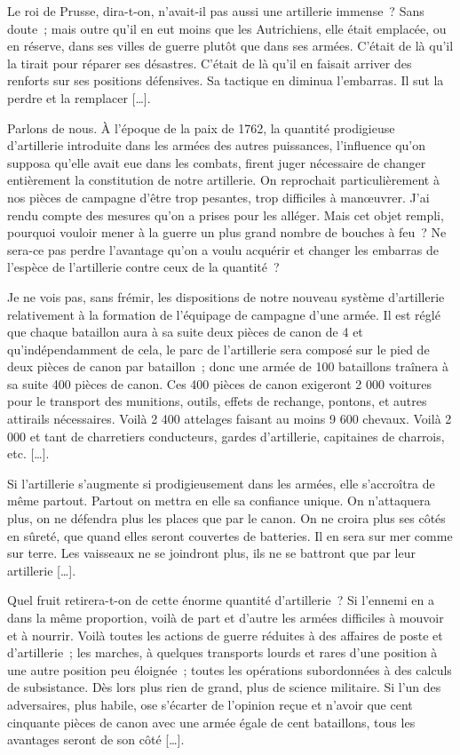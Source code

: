\documentclass[french,twoside]{book} %
\begin{document}
Le roi de Prusse, dira-t-on, n’avait-il pas aussi une artillerie immense ? Sans doute ; mais outre qu’il en eut moins que les Autrichiens, elle était emplacée, ou en réserve, dans ses villes de guerre plutôt que dans ses armées. C’était de là qu’il la tirait pour réparer ses désastres. C’était de là qu’il en faisait arriver des renforts sur ses positions défensives. Sa tactique en diminua l’embarras. Il sut la perdre et la remplacer […].\par
Parlons de nous. À l’époque de la paix de 1762, la quantité prodigieuse d’artillerie introduite dans les armées des autres puissances, l’influence qu’on supposa qu’elle avait eue dans les combats, firent juger nécessaire de changer entièrement la constitution de notre artillerie. On reprochait particulièrement à nos pièces de campagne d’être trop pesantes, trop difficiles à manœuvrer. J’ai rendu compte des mesures qu’on a prises pour les alléger. Mais cet objet rempli, pourquoi vouloir mener à la guerre un plus grand nombre de bouches à feu ? Ne sera-ce pas perdre l’avantage qu’on a voulu acquérir et changer les embarras de l’espèce de l’artillerie contre ceux de la quantité ?\par
Je ne vois pas, sans frémir, les dispositions de notre nouveau système d’artillerie relativement à la formation de l’équipage de campagne d’une armée. Il est réglé que chaque bataillon aura à sa suite deux pièces de canon de 4 et qu’indépendamment de cela, le parc de l’artillerie sera composé sur le pied de deux pièces de canon par bataillon ; donc une armée de 100 bataillons traînera à sa suite 400 pièces de canon. Ces 400 pièces de canon exigeront 2 000 voitures pour le transport des munitions, outils, effets de rechange, pontons, et autres attirails nécessaires. Voilà 2 400 attelages faisant au moins 9 600 chevaux. Voilà 2 000 et tant de charretiers conducteurs, gardes d’artillerie, capitaines de charrois, etc. […].\par
Si l’artillerie s’augmente si prodigieusement dans les armées, elle s’accroîtra de même partout. Partout on mettra en elle sa confiance unique. On n’attaquera plus, on ne défendra plus les places que par le canon. On ne croira plus ses côtés en sûreté, que quand elles seront couvertes de batteries. Il en sera sur mer comme sur terre. Les vaisseaux ne se joindront plus, ils ne se battront que par leur artillerie […].\par
Quel fruit retirera-t-on de cette énorme quantité d’artillerie ? Si l’ennemi en a dans la même proportion, voilà de part et d’autre les armées difficiles à mouvoir et à nourrir. Voilà toutes les actions de guerre réduites à des affaires de poste et d’artillerie ; les marches, à quelques transports lourds et rares d’une position à une autre position peu éloignée ; toutes les opérations subordonnées à des calculs de subsistance. Dès lors plus rien de grand, plus de science militaire. Si l’un des adversaires, plus habile, ose s’écarter de l’opinion reçue et n’avoir que cent cinquante pièces de canon avec une armée égale de cent bataillons, tous les avantages seront de son côté […].\par
\end{document}
